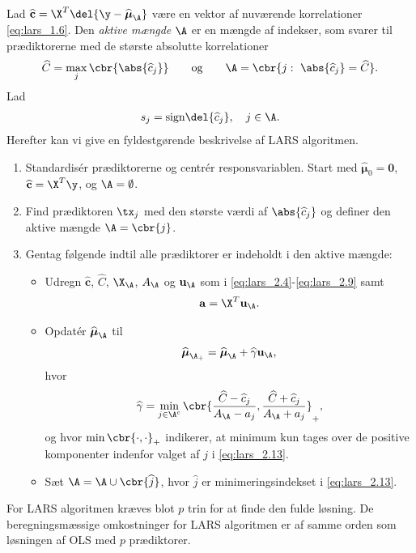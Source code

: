 Lad \(\widehat{\mathbf{c}} = \X^T \del{\y - \widehat{\boldsymbol{\mu}}_\A}\) være en vektor af nuværende korrelationer \eqref{eq:lars_1.6}.
Den \textit{aktive mængde} \(\A\) er en mængde af indekser, som svarer til prædiktorerne med de største absolutte korrelationer
\begin{align}
\widehat{C} = \max_j \cbr{\abs{\widehat{c}_j}}  \qquad \text{og} \qquad \A= \cbr{j: \ \abs{ \widehat{c}_j} = \widehat{C}}. \label{eq:lars_2.9}
\end{align}
Lad 
\begin{align}
s_j = \text{sign} \del{\widehat{c}_j}, \quad j \in \A. \label{eq:lars_2.10}
\end{align}
%
Herefter kan vi give en fyldestgørende beskrivelse af LARS algoritmen.
%
\begin{alg} 
\begin{enumerate}
\item Standardisér prædiktorerne og centrér responsvariablen. 
Start med \(\widehat{\boldsymbol{\mu}}_0 = \mathbf{0}\), \(\widehat{\mathbf{c}} = \X^T \y\), og \(\A = \emptyset\).
\item Find prædiktoren \(\tx_j\) med den største værdi af \(\abs{\widehat{c}_j}\) og definer den aktive mængde \(\A = \cbr{j}\).
\item 
Gentag følgende indtil alle prædiktorer er indeholdt i den aktive mængde:
\begin{itemize}
\item Udregn \(\widehat{\mathbf{c}}\), \(\widehat{C}\), \(\X_\A\), \(A_\A\) og \(\mathbf{u}_\A\) som i \eqref{eq:lars_2.4}-\ref{eq:lars_2.9} samt
\begin{align*}
\mathbf{a} = \X^T \mathbf{u}_\A.
\end{align*}
\item Opdatér \(\widehat{\boldsymbol{\mu}}_\A\) til
\begin{align}
\widehat{\boldsymbol{\mu}}_{\A_+} = \widehat{\boldsymbol{\mu}}_\A + \widehat{\gamma} \mathbf{u}_\A, \label{eq:lars_2.12}
\end{align}
hvor 
\begin{align}
\widehat{\gamma} = \min_{j \in \A^c} \cbr{ \frac{\widehat{C}- \widehat{c}_j}{A_\A - a_j} , \frac{\widehat{C} + \widehat{c}_j}{A_\A + a_j}}_+, \label{eq:lars_2.13}
\end{align}
og hvor \(\min \cbr{\cdot , \cdot}_+\) indikerer, at minimum kun tages over de positive komponenter indenfor valget af \(j\) i \eqref{eq:lars_2.13}.
\item Sæt \(\A = \A \cup \cbr{\widehat{j}}\), hvor \(\widehat{j}\) er minimeringsindekset i \eqref{eq:lars_2.13}.
\end{itemize}
\end{enumerate}
\end{alg}
%
For LARS algoritmen kræves blot \(p\) trin for at finde den fulde løsning.
De beregningsmæssige omkostninger for LARS algoritmen er af samme orden som løsningen af OLS med \(p\) prædiktorer.

